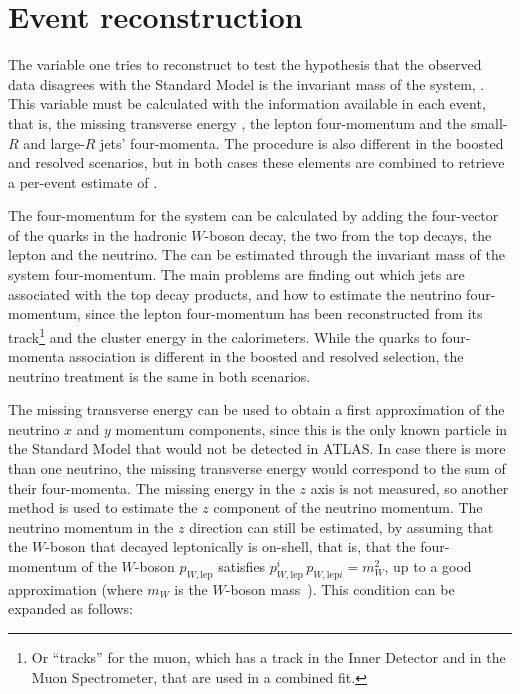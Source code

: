 \section{Event reconstruction}
\label{sec:ttbarres7_rec}

The variable one tries to reconstruct to test the hypothesis that the observed data disagrees with the Standard Model is the invariant mass of
the \ttbar system, \mtt. This variable must be calculated with the information available in each event, that is, the missing transverse energy \met,
the lepton four-momentum and the small-$R$ and large-$R$ jets' four-momenta. The procedure is also different in the boosted and resolved scenarios, but in both cases these
elements are combined to retrieve a per-event estimate of \mtt.

The four-momentum for the \ttbar system can be calculated by adding the four-vector of the quarks in the hadronic $W$-boson decay, the two \bjets from the top decays, the lepton
and the neutrino. The \mtt can be estimated through the invariant mass of the \ttbar system four-momentum. The main problems are finding out which jets are associated with
the top decay products, and how to estimate the neutrino four-momentum, since the lepton four-momentum has been reconstructed from its track\footnote{Or
``tracks'' for the muon, which has a track in the Inner Detector and in the Muon Spectrometer, that are used in a combined fit.} and the cluster energy in the calorimeters.
While the quarks to four-momenta association is different in the boosted and resolved selection, the neutrino treatment is the same in both scenarios.

The missing transverse energy can be used to obtain a first approximation of the neutrino $x$ and $y$ momentum components, since this is the only known particle in the
Standard Model that would not be detected in ATLAS. In case there is more than one neutrino, the missing transverse energy would correspond to the sum of their four-momenta.
The missing energy in the $z$ axis is not measured, so another method
is used to estimate the $z$ component of the neutrino momentum.
The neutrino momentum in the $z$ direction can still be estimated, by assuming that the $W$-boson that decayed leptonically is on-shell, that is, that the four-momentum
of the $W$-boson $p_{W, \textrm{lep}}$ satisfies $p_{W, \textrm{lep}}^i \, p_{W, \textrm{lep} i} = m_W^2$, up to a good approximation (where $m_W$ is the $W$-boson mass~\cite{pdg2012}).
This condition can be expanded as follows:

